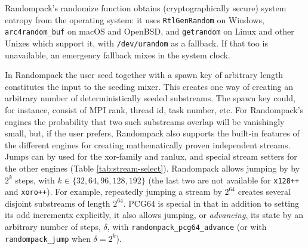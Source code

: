 \documentclass[manuscript,screen,review]{acmart}
\begin{document}
Randompack’s randomize function obtains (cryptographically secure)
system entropy from the operating system: it uses
\texttt{RtlGenRandom} on Windows, \texttt{arc4random\_buf} on macOS
and OpenBSD, and \texttt{getrandom} on Linux and other Unixes which
support it, with \texttt{/dev/urandom} as a fallback. If that too is
unavailable, an emergency fallback mixes in the system clock.

In Randompack the user seed together with a spawn key of arbitrary
length constitutes the input to the seeding mixer. This creates one
way of creating an arbitrary number of deterministically seeded
substreams. The spawn key could, for instance, consist of MPI rank,
thread id, task number, etc. For Randompack's engines the probability
that two such substreams overlap will be vanishingly small, but, if
the user prefers, Randompack also supports the built-in features of
the different engines for creating mathematically proven independent
streams. Jumps can by used for the xor-family and ranlux, and special
stream setters for the other engines (Table \ref{tab:stream-select}).
Randompack allows jumping by by $2^k$ steps, with $k \in
\{32,64,96,128,192\}$ (the last two are not available for
\texttt{x128++} and \texttt{xoro++}). For example, repeatedly jumping
a stream by $2^{64}$ creates several disjoint substreams of length
$2^{64}$. PCG64 is special in that in addition to setting its odd
incrementx explicitly, it also allows jumping, or
\emph{advancing}, its state by an arbitrary number of steps, $\delta$,
with \texttt{randompack\_pcg64\_advance} (or with
\texttt{randompack\_jump} when $\delta = 2^k$).
\end{document}
